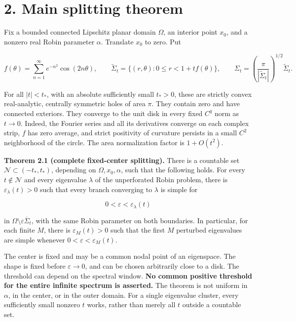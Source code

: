\documentclass[11pt]{article}
\begin{document}
\section{2. Main splitting theorem}\label{main-splitting-theorem}

Fix a bounded connected Lipschitz planar domain \(\Omega\), an interior
point \(x_0\), and a nonzero real Robin parameter \(\alpha\). Translate
\(x_0\) to zero. Put

\[
 f(\theta)=\sum_{n=1}^{\infty}e^{-n^2}\cos(2n\theta),
 \qquad
 \widetilde\Sigma_t=\{(r,\theta):0\le r<1+t f(\theta)\},
 \qquad
 \Sigma_t=\left(\frac{\pi}{|\widetilde\Sigma_t|}\right)^{1/2}
                      \widetilde\Sigma_t.
 \tag{H1}
\]

For all \(|t|<t_*\), with an absolute sufficiently small \(t_*>0\),
these are strictly convex real-analytic, centrally symmetric holes of
area \(\pi\). They contain zero and have connected exteriors. They
converge to the unit disk in every fixed \(C^q\) norm as \(t\to0\).
Indeed, the Fourier series and all its derivatives converge on each
complex strip, \(f\) has zero average, and strict positivity of
curvature persists in a small \(C^2\) neighborhood of the circle. The
area normalization factor is \(1+O(t^2)\).

\textbf{Theorem 2.1 (complete fixed-center splitting).} There is a
countable set \(\mathcal N\subset(-t_*,t_*)\), depending on
\(\Omega,x_0,\alpha\), such that the following holds. For every
\(t\notin\mathcal N\) and every eigenvalue \(\lambda\) of the
unperforated Robin problem, there is \(\varepsilon_\lambda(t)>0\) such
that every branch converging to \(\lambda\) is simple for

\[
 0<\varepsilon<\varepsilon_\lambda(t)
\]

in \(\Omega\setminus\varepsilon\overline\Sigma_t\), with the same Robin
parameter on both boundaries. In particular, for each finite \(M\),
there is \(\varepsilon_M(t)>0\) such that the first \(M\) perturbed
eigenvalues are simple whenever \(0<\varepsilon<\varepsilon_M(t)\).

The center is fixed and may be a common nodal point of an eigenspace.
The shape is fixed before \(\varepsilon\to0\), and can be chosen
arbitrarily close to a disk. The threshold can depend on the spectral
window. \textbf{No common positive threshold for the entire infinite
spectrum is asserted.} The theorem is not uniform in \(\alpha\), in the
center, or in the outer domain. For a single eigenvalue cluster, every
sufficiently small nonzero \(t\) works, rather than merely all \(t\)
outside a countable set.
\end{document}
